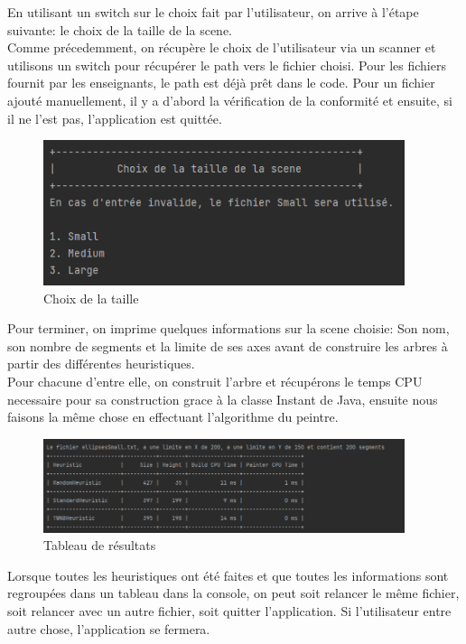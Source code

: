 \documentclass[a4paper,12pt]{report}	%
\begin{document}
\indent En utilisant un switch sur le choix fait par l'utilisateur, on arrive à l'étape suivante: le choix de la taille de la scene.\\
\indent Comme précedemment, on récupère le choix de l'utilisateur via un scanner et utilisons un switch pour récupérer le path vers le fichier choisi. Pour les fichiers fournit par les enseignants, le path est déjà prêt dans le code. Pour un fichier ajouté manuellement, il y a d'abord la vérification de la conformité et ensuite, si il ne l'est pas, l'application est quittée. \\
\begin{figure}[H]
\begin{center}
  \includegraphics[width=400px]{scizeChoice.png}
  \caption{Choix de la taille}\label{fig:PERT}
\end{center}
\end{figure}
\indent Pour terminer, on imprime quelques informations sur la scene choisie: Son nom, son nombre de segments et la limite de ses axes avant de construire les arbres à partir des différentes heuristiques.\\
\indent Pour chacune d'entre elle, on construit l'arbre et récupérons le temps CPU necessaire pour sa construction grace à la classe Instant de Java, ensuite nous faisons la même chose en effectuant l'algorithme du peintre. \\
\begin{figure}[H]
\begin{center}
  \includegraphics[width=400px]{tree.png}
  \caption{Tableau de résultats}\label{fig:PERT}
\end{center}
\end{figure}
\indent Lorsque toutes les heuristiques ont été faites et que toutes les informations sont regroupées dans un tableau dans la console, on peut soit relancer le même fichier, soit relancer avec un autre fichier, soit quitter l'application. Si l'utilisateur entre autre chose, l'application se fermera.\\
\end{document}
